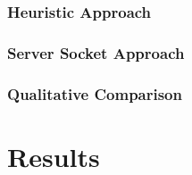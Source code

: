 \subsubsection{Heuristic Approach}

\subsubsection{Server Socket Approach}

\subsubsection{Qualitative Comparison}


\section{Results}

